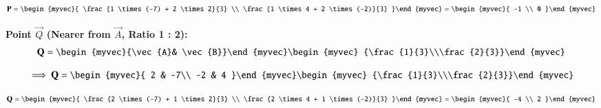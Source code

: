 \documentclass[journal]{IEEEtran}
\begin{document}
\begin{align}
\vec{P} = \begin{myvec}{
\frac{1 \times (-7) + 2 \times 2}{3} \\
\frac{1 \times 4 + 2 \times (-2)}{3}
}\end{myvec}
= \begin{myvec}{ -1 \\ 0 }\end{myvec}
\end{align}

\textbf{Point \( \vec{Q} \) (Nearer from \( \vec{A} \), Ratio 1 : 2):}
\begin{align}   
\vec{Q} = \begin{myvec}{\vec{A}& \vec{B}}\end{myvec}\begin{myvec}
        {\frac{1}{3}\\\frac{2}{3}}\end{myvec}    
\end{align}       

\begin{align}
\implies \vec{Q}=\begin{myvec}{ 2 & -7\\ -2 & 4 }\end{myvec}\begin{myvec}
        {\frac{1}{3}\\\frac{2}{3}}\end{myvec}\\
\end{align}


\begin{align}
\vec{Q} = \begin{myvec}{
\frac{2 \times (-7) + 1 \times 2}{3} \\
\frac{2 \times 4 + 1 \times (-2)}{3}
}\end{myvec}= \begin{myvec}{ -4 \\ 2 }\end{myvec}
\end{align}
\end{document}
